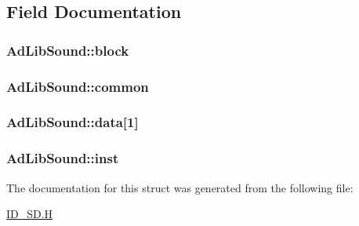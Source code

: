 \subsection{Field Documentation}
\hypertarget{structAdLibSound_af6d810a8d7a44467809fb30c6e55b161}{
\subsubsection[{block}]{ {\bf AdLibSound::block}}}
\label{structAdLibSound_af6d810a8d7a44467809fb30c6e55b161}
\hypertarget{structAdLibSound_ae2615aaecb5be148a6a6ddf9723076f3}{
\subsubsection[{common}]{ {\bf AdLibSound::common}}}
\label{structAdLibSound_ae2615aaecb5be148a6a6ddf9723076f3}
\hypertarget{structAdLibSound_a73b03ff21dbe86b08f21d3eb0f9adb64}{
\subsubsection[{data}]{ {\bf AdLibSound::data}\mbox{[}1\mbox{]}}}
\label{structAdLibSound_a73b03ff21dbe86b08f21d3eb0f9adb64}
\hypertarget{structAdLibSound_a2122cab68a2f7e318ea1b524f0c24d9d}{
\subsubsection[{inst}]{ {\bf AdLibSound::inst}}}
\label{structAdLibSound_a2122cab68a2f7e318ea1b524f0c24d9d}


The documentation for this struct was generated from the following file:\begin{DoxyCompactItemize}
\item 
\hyperlink{ID__SD_8H}{ID\_\-SD.H}\end{DoxyCompactItemize}
